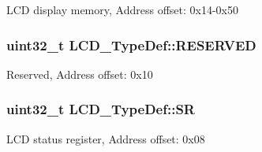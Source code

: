 L\-C\-D display memory, Address offset\-: 0x14-\/0x50 \hypertarget{struct_l_c_d___type_def_a556dfa8484476079c2ab593766754d02}{
\subsubsection[{R\-E\-S\-E\-R\-V\-E\-D}]{\setlength{\rightskip}{0pt plus 5cm}uint32\-\_\-t L\-C\-D\-\_\-\-Type\-Def\-::\-R\-E\-S\-E\-R\-V\-E\-D}}\label{struct_l_c_d___type_def_a556dfa8484476079c2ab593766754d02}
Reserved, Address offset\-: 0x10 \hypertarget{struct_l_c_d___type_def_ad54495b57709dac1909e1f90d147606b}{
\subsubsection[{S\-R}]{ uint32\-\_\-t L\-C\-D\-\_\-\-Type\-Def\-::\-S\-R}}\label{struct_l_c_d___type_def_ad54495b57709dac1909e1f90d147606b}
L\-C\-D status register, Address offset\-: 0x08 

